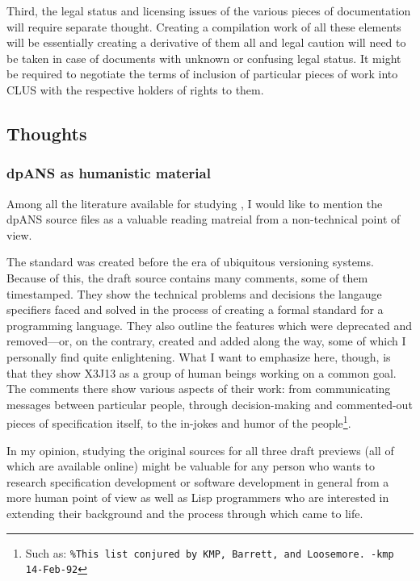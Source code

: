 Third, the legal status and licensing issues of the various pieces of documentation will require separate thought. Creating a compilation work of all these elements will be essentially creating a derivative of them all and legal caution will need to be taken in case of documents with unknown or confusing legal status. It might be required to negotiate the terms of inclusion of particular pieces of work into CLUS with the respective holders of rights to them.

\subsection{Thoughts}

\subsubsection{dpANS as humanistic material}
Among all the literature available for studying \cl{}, I would like to mention the dpANS source files as a valuable reading matreial from a non-technical point of view.

The standard was created before the era of ubiquitous versioning systems. Because of this, the draft source contains many comments, some of them timestamped. They show the technical problems and decisions the langauge specifiers faced and solved in the process of creating a formal standard for a programming language. They also outline the features which were deprecated and removed---or, on the contrary, created and added along the way, some of which I personally find quite enlightening. What I want to emphasize here, though, is that they show X3J13 as a group of human beings working on a common goal. The comments there show various aspects of their work: from communicating messages between particular people, through decision-making and commented-out pieces of specification itself, to the in-jokes and humor of the people\footnote{Such as: \texttt{\%This list conjured by KMP, Barrett, and Loosemore. -kmp 14-Feb-92}}.

In my opinion, studying the original sources for all three draft previews (all of which are available online) might be valuable for any person who wants to research specification development or software development in general from a more human point of view as well as Lisp programmers who are interested in extending their background and the process through which \cl{} came to life.

